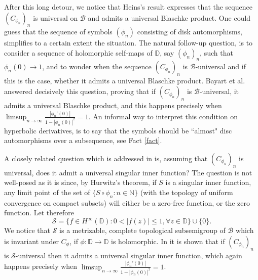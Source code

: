 \documentclass[12pt,a4paper]{amsart}
\theoremstyle{plain}
\theoremstyle{definition}
\theoremstyle{remark}
\theoremstyle{fact}
\begin{document}
After this long detour, we notice that Heins's result expresses that the sequence $(C_{\phi_n})_n$ is universal on $\mathcal{B}$ and admits a universal Blaschke product. One could guess that the sequence of symbols $(\phi_n)$ consisting of disk automorphisms, simplifies to a certain extent the situation. The natural follow-up question, is to consider a sequence of holomorphic self-maps of $\mathbb{D}$, say $(\phi_n)_n$, such that $\phi_n(0)\rightarrow 1$, and to wonder when the sequence $(C_{\phi_n})_n$ is $\mathcal{B}$-universal and if this is the case, whether it admits a universal Blaschke product. Bayart et al. \cite{BGGM09} answered decisively this question, proving that if $(C_{\phi_n})_n$ is $\mathcal{B}$-universal, it admits a universal Blaschke product, and this happens precisely when $\limsup_{n\rightarrow \infty}\frac{|\phi_n'(0)|}{1-|\phi_n(0)|^2}=1$. An informal way to interpret this condition on hyperbolic derivatives, is to say that the symbols should be ``almost" disc automorphisms over a subsequence, see Fact \ref{fact}.

A closely related question which is addressed in \cite{BGGM09} is, assuming that $(C_{\phi_n})_n$ is universal, does it admit a universal singular inner function? The question is not well-posed as it is since, by Hurwitz's theorem, if $S$ is a singular inner function, any limit point of the set of $\{S\circ \phi_n : n\in \mathbb{N}\}$ (with the topology of uniform convergence on compact subsets) will either be a zero-free function, or the zero function. Let therefore 
$$
\mathcal{S}=\{f\in H^{\infty}(\mathbb{D}): 0<|f(z)|\leq 1, \forall z \in \mathbb{D}\}\cup \{0\}.
$$
We notice that $\mathcal{S}$ is a metrizable, complete topological subsemigroup of $\mathcal{B}$ which is invariant under $C_{\phi}$, if $\phi: \mathbb{D}\rightarrow \mathbb{D}$ is holomorphic. In \cite{BGGM09} it is shown that if $(C_{\phi_n})_n$ is $\mathcal{S}$-universal then it admits a universal singular inner function, which again happens precisely when $\limsup_{n\rightarrow \infty}\frac{|\phi_n'(0)|}{1-|\phi_n(0)|^2}=1$.
\end{document}
